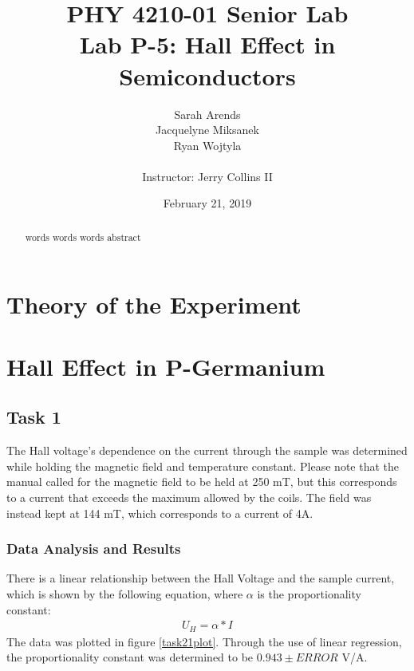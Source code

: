 \documentclass[a4paper]{article}
\title{PHY 4210-01 Senior Lab \\Lab P-5: Hall Effect in Semiconductors}
\author{Sarah Arends \\
        Jacquelyne Miksanek \\
        Ryan Wojtyla \\ \\
        Instructor: Jerry Collins II}
\date{February 21, 2019}
\begin{document}
\maketitle

\begin{abstract}
\qq words words words abstract
\end{abstract}

\newpage

\setcounter{tocdepth}{2}
\tableofcontents

\newpage

\section{Theory of the Experiment}

\section{Hall Effect in P-Germanium}

\subsection{Task 1}

\qq The Hall voltage's dependence on the current through the sample
was determined while holding the magnetic field and temperature constant. Please note that the manual called for the magnetic field to be held at 250 mT, 
but this corresponds to a current that exceeds the maximum allowed by 
the coils.
 The field was instead kept at 144 mT, which corresponds to a current of 4A.

\subsubsection{Data Analysis and Results}

There is a linear relationship between the Hall Voltage and the sample 
current, which is shown by the following equation, where $\alpha$ is
the proportionality constant:
\begin{align*}
U_H = \alpha * I
\end{align*}
The data was plotted in figure \ref{task21plot}. Through the use of linear regression, the proportionality constant was determined to be $0.943 \pm ERROR$ V/A. 
\end{document}

